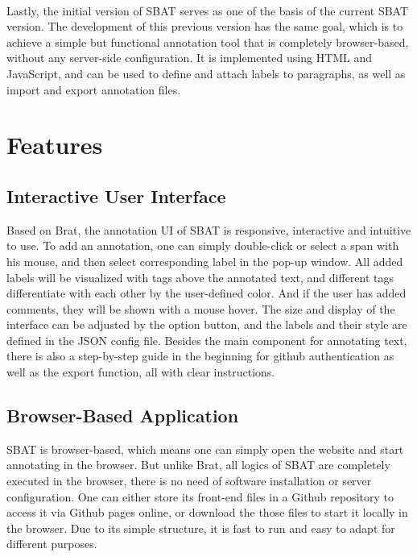 \documentclass[a4paper]{article}
\begin{document}
\\
Lastly, the initial version of SBAT \cite{SBAT} serves as one of the basis of the current SBAT version. The development of this previous version has the same goal, which is to achieve a simple but functional annotation tool that is completely browser-based, without any server-side configuration. It is implemented using HTML and JavaScript, and can be used to define and attach labels to paragraphs, as well as import and export annotation files.
\section{Features}
\subsection{Interactive User Interface}
Based on Brat, the annotation UI of SBAT is responsive, interactive and intuitive to use. To add an annotation, one can simply double-click or select a span with his mouse, and then select corresponding label in the pop-up window. All added labels will be visualized with tags above the annotated text, and different tags differentiate with each other by the user-defined color. And if the user has added comments, they will be shown with a mouse hover. The size and display of the interface can be adjusted by the option button, and the labels and their style are defined in the JSON config file. Besides the main component for annotating text, there is also a step-by-step guide in the beginning for github authentication as well as the export function, all with clear instructions.
\subsection{Browser-Based Application}
SBAT is browser-based, which means one can simply open the website and start annotating in the browser. But unlike Brat, all logics of SBAT are completely executed in the browser, there is no need of software installation or server configuration. One can either store its front-end files in a Github repository to access it via Github pages online, or download the those files to start it locally in the browser. Due to its simple structure, it is fast to run and easy to adapt for different purposes.
\end{document}
